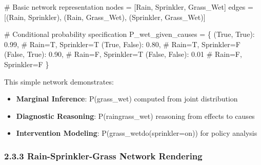 \documentclass[
  11pt,
  letterpaper,
]{book}
\newenvironment{Shaded}{\begin{snugshade}}{\end{snugshade}}
\newcommand{\CommentTok}[1]{\textcolor[rgb]{0.37,0.37,0.37}{#1}}
\newcommand{\FloatTok}[1]{\textcolor[rgb]{0.68,0.00,0.00}{#1}}
\newcommand{\NormalTok}[1]{\textcolor[rgb]{0.00,0.23,0.31}{#1}}
\newcommand{\OperatorTok}[1]{\textcolor[rgb]{0.37,0.37,0.37}{#1}}
\newcommand{\StringTok}[1]{\textcolor[rgb]{0.13,0.47,0.30}{#1}}
\newcommand{\VariableTok}[1]{\textcolor[rgb]{0.07,0.07,0.07}{#1}}
\providecommand{\tightlist}{%
  \setlength{\itemsep}{0pt}\setlength{\parskip}{0pt}}
\begin{document}
\begin{Shaded}
\begin{Highlighting}[]
\CommentTok{\# Basic network representation}
\NormalTok{nodes }\OperatorTok{=}\NormalTok{ [}\StringTok{\textquotesingle{}Rain\textquotesingle{}}\NormalTok{, }\StringTok{\textquotesingle{}Sprinkler\textquotesingle{}}\NormalTok{, }\StringTok{\textquotesingle{}Grass\_Wet\textquotesingle{}}\NormalTok{]}
\NormalTok{edges }\OperatorTok{=}\NormalTok{ [(}\StringTok{\textquotesingle{}Rain\textquotesingle{}}\NormalTok{, }\StringTok{\textquotesingle{}Sprinkler\textquotesingle{}}\NormalTok{), (}\StringTok{\textquotesingle{}Rain\textquotesingle{}}\NormalTok{, }\StringTok{\textquotesingle{}Grass\_Wet\textquotesingle{}}\NormalTok{), (}\StringTok{\textquotesingle{}Sprinkler\textquotesingle{}}\NormalTok{, }\StringTok{\textquotesingle{}Grass\_Wet\textquotesingle{}}\NormalTok{)]}

\CommentTok{\# Conditional probability specification}
\NormalTok{P\_wet\_given\_causes }\OperatorTok{=}\NormalTok{ \{}
\NormalTok{    (}\VariableTok{True}\NormalTok{, }\VariableTok{True}\NormalTok{): }\FloatTok{0.99}\NormalTok{,    }\CommentTok{\# Rain=T, Sprinkler=T}
\NormalTok{    (}\VariableTok{True}\NormalTok{, }\VariableTok{False}\NormalTok{): }\FloatTok{0.80}\NormalTok{,   }\CommentTok{\# Rain=T, Sprinkler=F  }
\NormalTok{    (}\VariableTok{False}\NormalTok{, }\VariableTok{True}\NormalTok{): }\FloatTok{0.90}\NormalTok{,   }\CommentTok{\# Rain=F, Sprinkler=T}
\NormalTok{    (}\VariableTok{False}\NormalTok{, }\VariableTok{False}\NormalTok{): }\FloatTok{0.01}   \CommentTok{\# Rain=F, Sprinkler=F}
\NormalTok{\}}
\end{Highlighting}
\end{Shaded}

This simple network demonstrates:

\begin{itemize}
\tightlist
\item
  \textbf{Marginal Inference}: P(grass\_wet) computed from joint
  distribution
\item
  \textbf{Diagnostic Reasoning}: P(rain\textbar grass\_wet) reasoning
  from effects to causes
\item
  \textbf{Intervention Modeling}: P(grass\_wet\textbar do(sprinkler=on))
  for policy analysis
\end{itemize}

\subsubsection{2.3.3 Rain-Sprinkler-Grass Network
Rendering}\label{rain-sprinkler-grass-network-rendering}
\end{document}
